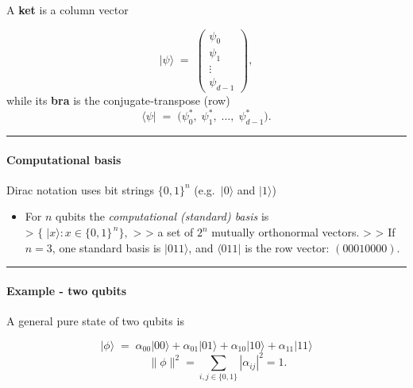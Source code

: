 A \textbf{ket} is a column vector

\[
\lvert\psi\rangle \;=\;
\begin{pmatrix}
\psi_0 \\ \psi_1 \\ \vdots \\ \psi_{d-1}
\end{pmatrix},
\] while its \textbf{bra} is the conjugate‑transpose (row)\\
\[
\langle\psi\lvert \;=\;
\bigl(\psi_0^{\!*},\;\psi_1^{\!*},\;\dots,\;\psi_{d-1}^{\!*}\bigr).
\]

\begin{center}\rule{0.5\linewidth}{0.5pt}\end{center}

\hypertarget{computational-basis}{%
\paragraph{Computational basis}\label{computational-basis}}

Dirac notation uses bit strings \(\{0,1\}^n\) (e.g.~\(\lvert0\rangle\)
and \(\lvert1\rangle\))

\begin{itemize}
\tightlist
\item
  For \(n\) qubits the \emph{computational (standard) basis} is\\
  \textgreater{}
  \(\bigl\{\;\lvert x\rangle : x\in\{0,1\}^{\,n}\bigr\},\)
  \textgreater{} \textgreater{} a set of \(2^{n}\) mutually orthonormal
  vectors. \textgreater{} \textgreater{} If \(n = 3\), one standard
  basis is \(\lvert011\rangle\), and \(\langle011\lvert\) is the row
  vector: \((00010000)\).
\end{itemize}

\begin{center}\rule{0.5\linewidth}{0.5pt}\end{center}

\hypertarget{example---two-qubits}{%
\paragraph{Example - two qubits}\label{example---two-qubits}}

A general pure state of two qubits is

\[
\lvert\phi\rangle \;=\;
\alpha_{00}\lvert 00\rangle + 
\alpha_{01}\lvert 01\rangle + 
\alpha_{10}\lvert 10\rangle + 
\alpha_{11}\lvert 11\rangle
\] \[
\qquad
\|\phi\|^{2}
=\sum_{i,j\in\{0,1\}} |\alpha_{ij}|^{2}=1 .
\]

